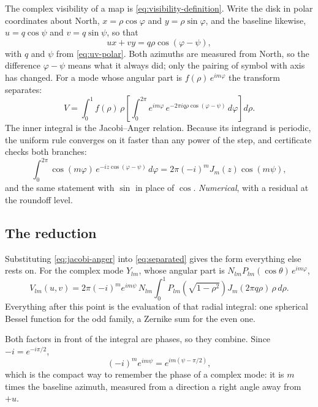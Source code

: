 The complex visibility of a map is \eqref{eq:visibility-definition}.  Write the
disk in polar coordinates about North, $x = \rho\cos\varphi$ and
$y = \rho\sin\varphi$, and the baseline likewise, $u = q\cos\psi$ and
$v = q\sin\psi$, so that
\begin{equation}
  u x + v y = q\rho \cos(\varphi - \psi) ,
  \label{eq:phase-polar}
\end{equation}
with $q$ and $\psi$ from \eqref{eq:uv-polar}.  Both azimuths are measured from
North, so the difference $\varphi-\psi$ means what it always did; only the pairing
of symbol with axis has changed.  For a mode whose angular part is
$f(\rho)\,e^{im\varphi}$ the transform separates:
\begin{equation}
  V = \int_0^1 f(\rho)\,\rho
      \left[ \int_0^{2\pi} e^{im\varphi}\,
      e^{-2\pi i q\rho\cos(\varphi-\psi)} \, d\varphi \right] d\rho .
  \label{eq:separated}
\end{equation}
The inner integral is the Jacobi--Anger relation.  Because its integrand is
periodic, the uniform rule converges on it faster than any power of the step, and
certificate  checks both branches:
\begin{equation}
  \int_0^{2\pi} \cos(m\varphi)\, e^{-iz\cos(\varphi-\psi)} \, d\varphi
  = 2\pi(-i)^m J_m(z)\cos(m\psi) ,
  \label{eq:jacobi-anger}
\end{equation}
and the same statement with $\sin$ in place of $\cos$.  \emph{Numerical}, with a
residual at the roundoff level.

\subsection{The reduction}
\label{sec:master}

Substituting \eqref{eq:jacobi-anger} into \eqref{eq:separated} gives the form
everything else rests on.  For the complex mode $Y_{lm}$, whose angular part is
$N_{lm}P_{lm}(\cos\theta)\,e^{im\varphi}$,
\begin{equation}
  V_{lm}(u,v) = 2\pi(-i)^m e^{im\psi}\, N_{lm}
  \int_0^1 P_{lm}\!\left(\sqrt{1-\rho^2}\right) J_m(2\pi q\rho)\,\rho\,d\rho .
  \label{eq:master-reduction}
\end{equation}
Everything after this point is the evaluation of that radial integral: one
spherical Bessel function for the odd family, a Zernike sum for the even one.

Both factors in front of the integral are phases, so they combine.  Since
$-i = e^{-i\pi/2}$,
\begin{equation}
  (-i)^m e^{im\psi} = e^{im(\psi - \pi/2)} ,
  \label{eq:phase-packed}
\end{equation}
which is the compact way to remember the phase of a complex mode: it is $m$ times
the baseline azimuth, measured from a direction a right angle away from $+u$.

